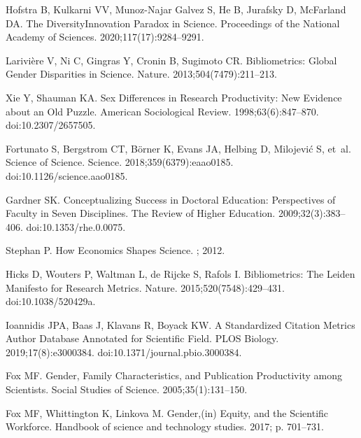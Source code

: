 \documentclass[
  10pt,
  letterpaper,
]{article}
\begin{document}
\renewcommand{\bibsection}{}
\begin{thebibliography}{10}

Hofstra B, Kulkarni VV, {Munoz-Najar Galvez} S, He B, Jurafsky D, McFarland DA.
\newblock The Diversity{\textendash}Innovation Paradox in Science.
\newblock Proceedings of the National Academy of Sciences. 2020;117(17):9284--9291.

Larivi{\`e}re V, Ni C, Gingras Y, Cronin B, Sugimoto CR.
\newblock Bibliometrics: {{Global}} Gender Disparities in Science.
\newblock Nature. 2013;504(7479):211--213.

Xie Y, Shauman KA.
\newblock Sex {{Differences}} in {{Research Productivity}}: {{New Evidence}} about an {{Old Puzzle}}.
\newblock American Sociological Review. 1998;63(6):847--870.
\newblock doi:{10.2307/2657505}.

Fortunato S, Bergstrom CT, B{\"o}rner K, Evans JA, Helbing D, Milojevi{\'c} S, et~al.
\newblock Science of Science.
\newblock Science. 2018;359(6379):eaao0185.
\newblock doi:{10.1126/science.aao0185}.

Gardner SK.
\newblock Conceptualizing {{Success}} in {{Doctoral Education}}: {{Perspectives}} of {{Faculty}} in {{Seven Disciplines}}.
\newblock The Review of Higher Education. 2009;32(3):383--406.
\newblock doi:{10.1353/rhe.0.0075}.

Stephan P.
\newblock How Economics Shapes Science.
; 2012.

Hicks D, Wouters P, Waltman L, {de Rijcke} S, Rafols I.
\newblock Bibliometrics: {{The Leiden Manifesto}} for Research Metrics.
\newblock Nature. 2015;520(7548):429--431.
\newblock doi:{10.1038/520429a}.

Ioannidis JPA, Baas J, Klavans R, Boyack KW.
\newblock A Standardized Citation Metrics Author Database Annotated for Scientific Field.
\newblock PLOS Biology. 2019;17(8):e3000384.
\newblock doi:{10.1371/journal.pbio.3000384}.

Fox MF.
\newblock Gender, Family Characteristics, and Publication Productivity among Scientists.
\newblock Social Studies of Science. 2005;35(1):131--150.

Fox MF, Whittington K, Linkova M.
\newblock Gender,(in) Equity, and the Scientific Workforce.
\newblock Handbook of science and technology studies. 2017; p. 701--731.


\end{thebibliography}
\end{document}
